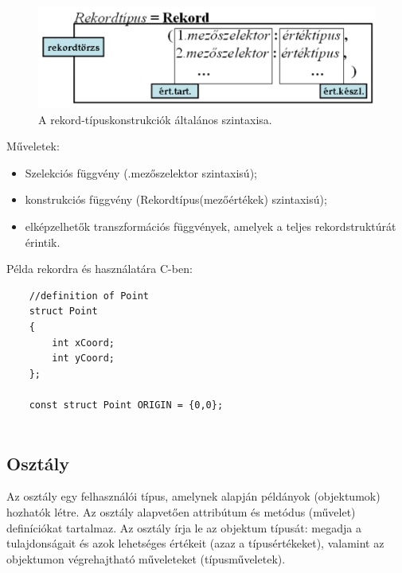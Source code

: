 \documentclass[margin=0px]{article}
\begin{document}
\begin{figure}[H]
    \centering
    \includegraphics[width=0.7\linewidth]{img/rekord}
    \caption{A rekord-típuskonstrukciók általános szintaxisa.}
    \label{fig:rekord}
\end{figure}

\noindent Műveletek:
\begin{itemize}
    \item	Szelekciós függvény (.mezőszelektor szintaxisú);

    \item	konstrukciós függvény (Rekordtípus(mezőértékek) szintaxisú);

    \item	elképzelhetők transzformációs függvények, amelyek a teljes rekordstruktúrát érintik.
\end{itemize}

\noindent Példa rekordra és használatára C-ben:
\begin{verbatim}
    //definition of Point
    struct Point 
    {
        int xCoord;
        int yCoord;
    };
    
    const struct Point ORIGIN = {0,0};
        
\end{verbatim}

\subsection{Osztály}

Az osztály egy felhasználói típus, amelynek alapján példányok (objektumok)
hozhatók létre. Az osztály alapvetően attribútum és metódus (művelet) definíciókat
tartalmaz. Az osztály írja le az objektum típusát: megadja a tulajdonságait és azok
lehetséges értékeit (azaz a típusértékeket), valamint az objektumon végrehajtható műveleteket (típusműveletek).\\
\end{document}
